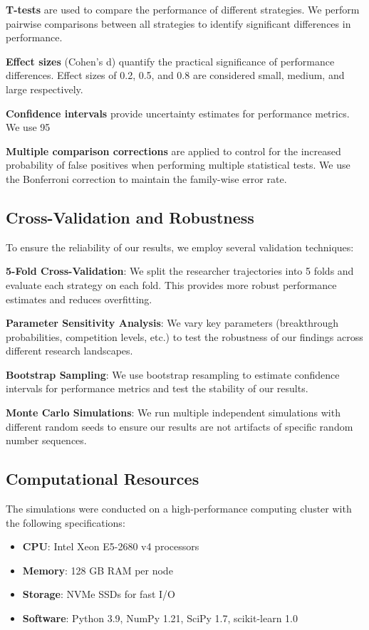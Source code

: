 \documentclass[letterpaper]{article} %
\begin{document}
\textbf{T-tests} are used to compare the performance of different strategies. We perform pairwise comparisons between all strategies to identify significant differences in performance.

\textbf{Effect sizes} (Cohen's d) quantify the practical significance of performance differences. Effect sizes of 0.2, 0.5, and 0.8 are considered small, medium, and large respectively.

\textbf{Confidence intervals} provide uncertainty estimates for performance metrics. We use 95%

\textbf{Multiple comparison corrections} are applied to control for the increased probability of false positives when performing multiple statistical tests. We use the Bonferroni correction to maintain the family-wise error rate.

\subsection{Cross-Validation and Robustness}

To ensure the reliability of our results, we employ several validation techniques:

\textbf{5-Fold Cross-Validation}: We split the researcher trajectories into 5 folds and evaluate each strategy on each fold. This provides more robust performance estimates and reduces overfitting.

\textbf{Parameter Sensitivity Analysis}: We vary key parameters (breakthrough probabilities, competition levels, etc.) to test the robustness of our findings across different research landscapes.

\textbf{Bootstrap Sampling}: We use bootstrap resampling to estimate confidence intervals for performance metrics and test the stability of our results.

\textbf{Monte Carlo Simulations}: We run multiple independent simulations with different random seeds to ensure our results are not artifacts of specific random number sequences.

\subsection{Computational Resources}

The simulations were conducted on a high-performance computing cluster with the following specifications:
\begin{itemize}
\item \textbf{CPU}: Intel Xeon E5-2680 v4 processors
\item \textbf{Memory}: 128 GB RAM per node
\item \textbf{Storage}: NVMe SSDs for fast I/O
\item \textbf{Software}: Python 3.9, NumPy 1.21, SciPy 1.7, scikit-learn 1.0
\end{itemize}
\end{document}
